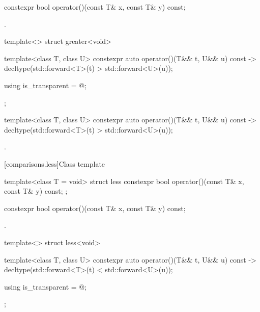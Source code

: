 %
\begin{itemdecl}
constexpr bool operator()(const T& x, const T& y) const;
\end{itemdecl}

\begin{itemdescr}
\pnum
\returns
{}.
\end{itemdescr}

%
\begin{itemdecl}
template<> struct greater<void> {
  template<class T, class U> constexpr auto operator()(T&& t, U&& u) const
    -> decltype(std::forward<T>(t) > std::forward<U>(u));

  using is_transparent = @\unspec@;
};
\end{itemdecl}

%
\begin{itemdecl}
template<class T, class U> constexpr auto operator()(T&& t, U&& u) const
    -> decltype(std::forward<T>(t) > std::forward<U>(u));
\end{itemdecl}

\begin{itemdescr}
\pnum
\returns
{}.
\end{itemdescr}

[comparisons.less]{Class template }

%
\begin{itemdecl}
template<class T = void> struct less {
  constexpr bool operator()(const T& x, const T& y) const;
};
\end{itemdecl}

%
\begin{itemdecl}
constexpr bool operator()(const T& x, const T& y) const;
\end{itemdecl}

\begin{itemdescr}
\pnum
\returns
{}.
\end{itemdescr}

%
\begin{itemdecl}
template<> struct less<void> {
  template<class T, class U> constexpr auto operator()(T&& t, U&& u) const
    -> decltype(std::forward<T>(t) < std::forward<U>(u));

  using is_transparent = @\unspec@;
};
\end{itemdecl}

